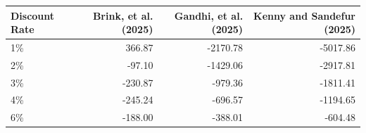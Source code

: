 \begin{tabular}{lrrr}
\toprule
Discount Rate & Brink, et al. (2025) & Gandhi, et al. (2025) & Kenny and Sandefur (2025) \\
\midrule
1\% & 366.87 & -2170.78 & -5017.86 \\
2\% & -97.10 & -1429.06 & -2917.81 \\
3\% & -230.87 & -979.36 & -1811.41 \\
4\% & -245.24 & -696.57 & -1194.65 \\
6\% & -188.00 & -388.01 & -604.48 \\
\bottomrule
\end{tabular}
